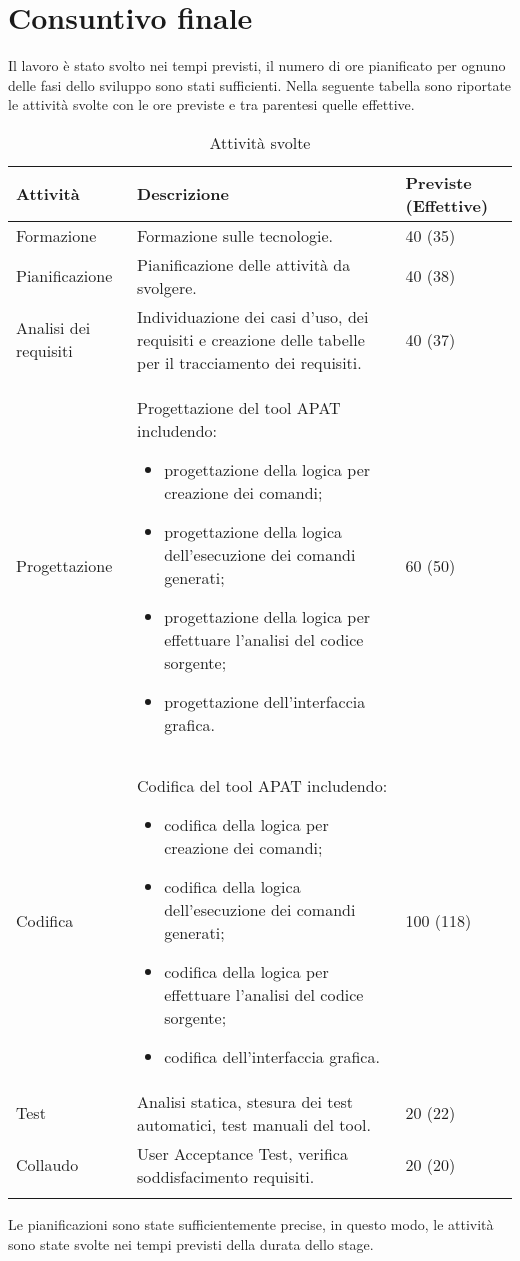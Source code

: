 


\section{Consuntivo finale}\label{sec:consuntivo-finale}
Il lavoro è stato svolto nei tempi previsti, il numero di ore pianificato per ognuno delle fasi dello sviluppo sono stati sufficienti.
Nella seguente tabella sono riportate le attività svolte con le ore previste e tra parentesi quelle effettive.

\begin{longtable}{|C{3cm}|C{8cm}|C{2cm}|}
    \hline
    \textbf{Attività} &
    \textbf{Descrizione} &
    \textbf{Previste} (\textbf{Effettive}) \\\hline
    Formazione     & Formazione sulle tecnologie.
    & 40 (35) \\\hline
    Pianificazione & Pianificazione delle attività da svolgere.
    & 40 (38)    \\\hline
    Analisi dei requisiti & Individuazione dei casi d'uso, dei requisiti e creazione delle tabelle per il tracciamento dei requisiti.
    & 40 (37) \\\hline

    Progettazione & Progettazione del tool APAT includendo:
    \begin{itemize}\itemsep0em
        \item progettazione della logica per creazione dei comandi;
        \item progettazione della logica dell'esecuzione dei comandi generati;
        \item progettazione della logica per effettuare l'analisi del codice sorgente;
        \item progettazione dell'interfaccia grafica.
    \end{itemize}
    &60 (50)\\\hline
    Codifica & Codifica del tool APAT includendo:
    \begin{itemize}\itemsep0em
        \item codifica della logica per creazione dei comandi;
        \item codifica della logica dell'esecuzione dei comandi generati;
        \item codifica della logica per effettuare l'analisi del codice sorgente;
        \item codifica dell'interfaccia grafica.
    \end{itemize}
    & 100 (118) \\\hline
    Test           & Analisi statica, stesura dei test automatici, test manuali del tool.
    & 20 (22)   \\\hline
    Collaudo       & User Acceptance Test, verifica soddisfacimento requisiti.
    & 20 (20)    \\\hline
    \caption{Attività svolte}
\end{longtable}
Le pianificazioni sono state sufficientemente precise, in questo modo, le attività sono state svolte nei tempi previsti della durata dello stage.